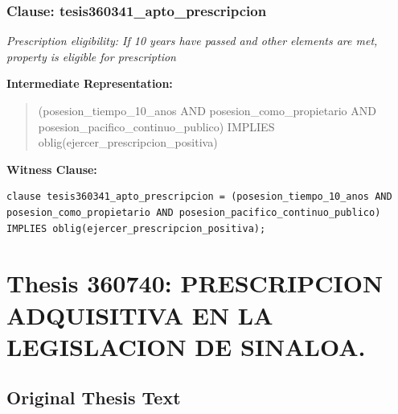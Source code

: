 \documentclass[11pt,a4paper]{article}
\begin{document}
\subsubsection{Clause: tesis360341\_apto\_prescripcion}

\textit{Prescription eligibility: If 10 years have passed and other elements are met, property is eligible for prescription}

\textbf{Intermediate Representation:}

\begin{quote}
(posesion\_tiempo\_10\_anos AND posesion\_como\_propietario AND posesion\_pacifico\_continuo\_publico) IMPLIES oblig(ejercer\_prescripcion\_positiva)
\end{quote}

\textbf{Witness Clause:}

\begin{lstlisting}[style=witnessstyle, language=Witness]
clause tesis360341_apto_prescripcion = (posesion_tiempo_10_anos AND posesion_como_propietario AND posesion_pacifico_continuo_publico) IMPLIES oblig(ejercer_prescripcion_positiva);
\end{lstlisting}

\newpage

\section{Thesis 360740: PRESCRIPCION ADQUISITIVA EN LA LEGISLACION DE SINALOA.}
\label{thesis:360740}

\subsection{Original Thesis Text}
\end{document}
